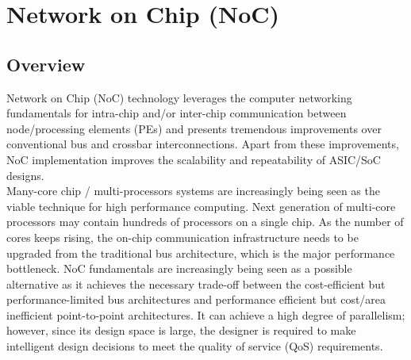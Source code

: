 \chapter{Network on Chip (NoC)}
\label{chapter2}
\section {Overview}
\hspace{5mm}Network on Chip (NoC) technology leverages the computer networking fundamentals for intra-chip and/or inter-chip communication between node/processing elements (PEs) and presents tremendous improvements over conventional bus and crossbar interconnections. Apart from these improvements, NoC implementation improves the scalability and repeatability of ASIC/SoC designs.\\


Many-core chip / multi-processors systems are increasingly being seen as the viable technique for high performance computing. Next generation of multi-core processors may contain hundreds of processors on a single chip. As the number of cores keeps rising, the on-chip communication infrastructure needs to be upgraded from the traditional bus architecture, which is the major performance bottleneck. NoC fundamentals are increasingly being seen as a possible alternative as it achieves the necessary trade-off between the cost-efficient but performance-limited bus architectures and performance efficient but cost/area inefficient point-to-point architectures. It can achieve a high degree of parallelism; however, since its design space is large, the designer is required to make intelligent design decisions to meet the quality of service (QoS) requirements.\\

